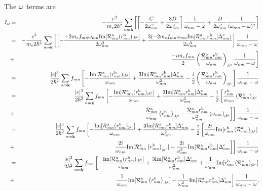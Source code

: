 The $\omega$ terms are
\begin{eqnarray}\label{pfia}
I_{\omega}
&=&
-\frac{e^3}{m_e2\hbar^2}
\sum_{nm\mathbf{k}}
\left[
\left[
-\frac{C}{2\omega^2_{nm}}
+
\frac{3D}{2\omega^3_{nm}}
\right]\frac{1}{\omega_{nm}-\omega}
+
\frac{D}{2\omega^2_{nm}}\frac{1}{(\omega_{nm}-\omega)^2}
\right]
\nonumber\\
&=&
-\frac{e^3}{m_e2\hbar^2}
\sum_{nm\mathbf{k}}
\left[
\left[
-\frac{-2m_ef_{mn}\omega_{mn}\mathrm{Im}[{\cal R}^{\mathrm{a}}_{mn}(r^{\mathrm{b}}_{nm})_{;k^{\mathrm{c}}}]
}{2\omega^2_{nm}}
+
\frac{3(-2m_ef_{mn}\omega_{mn}\mathrm{Im}[{\cal R}^{\mathrm{a}}_{mn}r^{\mathrm{b}}_{nm}]\Delta^{\mathrm{c}}_{nm})}{2\omega^3_{nm}}
\right]\frac{1}{\omega_{nm}-\omega}
\right.
\nonumber\\
&+&
\left.
\frac{-im_ef_{mn}}{2}
\left(
\frac{{\cal R}^{\mathrm{a}}_{mn}r^{\mathrm{b}}_{nm}}{\omega_{nm}}
\right)_{;k^{\mathrm{c}}}
\frac{1}{\omega_{nm}-\omega}
\right]
\nonumber\\
&=&
\frac{|e|^3}{2\hbar^2}
\sum_{nm\mathbf{k}}
f_{mn}
\left[
-\frac{\mathrm{Im}[{\cal R}^{\mathrm{a}}_{mn}(r^{\mathrm{b}}_{nm})_{;k^{\mathrm{c}}}]
}{\omega_{nm}}
+
\frac{3\mathrm{Im}[{\cal R}^{\mathrm{a}}_{mn}r^{\mathrm{b}}_{nm}]\Delta^{\mathrm{c}}_{nm}}{\omega^2_{nm}}
-
\frac{i}{2}
\left(
\frac{{\cal R}^{\mathrm{a}}_{mn}r^{\mathrm{b}}_{nm}}{\omega_{nm}}
\right)_{;k^{\mathrm{c}}}
\right]\frac{1}{\omega_{nm}-\omega}
\nonumber\\
&=&
\frac{|e|^3}{2\hbar^2}
\sum_{nm\mathbf{k}}
f_{mn}
\left[
-\frac{\mathrm{Im}[{\cal R}^{\mathrm{a}}_{mn}(r^{\mathrm{b}}_{nm})_{;k^{\mathrm{c}}}]
}{\omega_{nm}}
+
\frac{3\mathrm{Im}[{\cal R}^{\mathrm{a}}_{mn}r^{\mathrm{b}}_{nm}]\Delta^{\mathrm{c}}_{nm}}{\omega^2_{nm}}
-
\frac{i}{2}
\left[
\frac{r^{\mathrm{b}}_{nm}}{\omega_{nm}}
\left(
{\cal R}^{\mathrm{a}}_{mn}
\right)_{;k^{\mathrm{c}}}
\right.
\right.
\nonumber\\
&+&
\left.
\left.
\frac{{\cal R}^{\mathrm{a}}_{mn}}{\omega_{nm}}
\left(
r^{\mathrm{b}}_{nm}
\right)_{;k^{\mathrm{c}}}
-
\frac{{\cal R}^{\mathrm{a}}_{mn}r^{\mathrm{b}}_{nm}}{\omega^2_{nm}}
\left(
\omega_{nm}
\right)_{;k^{\mathrm{c}}}
\right]
\right]
\frac{1}{\omega_{nm}-\omega}
\nonumber\\
&=&
\frac{|e|^3}{2\hbar^2}
\sum_{nm\mathbf{k}}
f_{mn}
\left[
-\frac{\mathrm{Im}[{\cal R}^{\mathrm{a}}_{mn}(r^{\mathrm{b}}_{nm})_{;k^{\mathrm{c}}}]
}{\omega_{nm}}
+
\frac{3\mathrm{Im}[{\cal R}^{\mathrm{a}}_{mn}r^{\mathrm{b}}_{nm}]\Delta^{\mathrm{c}}_{nm}}{\omega^2_{nm}}
-
\frac{i}{2}
\left[
\frac{2i}{\omega_{nm}}
\mathrm{Im}[r^{\mathrm{b}}_{nm}\left({\cal R}^{\mathrm{a}}_{mn}\right)_{;k^{\mathrm{c}}}]
\right.
\right.
\nonumber\\
&+&
\left.
\left.
\frac{2i}{\omega_{nm}}
\mathrm{Im}[
{\cal R}^{\mathrm{a}}_{mn}
\left(
r^{\mathrm{b}}_{nm}
\right)_{;k^{\mathrm{c}}}
]
-
\frac{2i}{\omega^2_{nm}}
\mathrm{Im}[{\cal R}^{\mathrm{a}}_{mn}r^{\mathrm{b}}_{nm}]
\Delta^{\mathrm{c}}_{nm}
\right]
\right]
\frac{1}{\omega_{nm}-\omega}
\nonumber\\
&=&
\frac{|e|^3}{2\hbar^2}
\sum_{nm\mathbf{k}}
f_{mn}
\left[
-\frac{\mathrm{Im}[{\cal R}^{\mathrm{a}}_{mn}(r^{\mathrm{b}}_{nm})_{;k^{\mathrm{c}}}]
}{\omega_{nm}}
+
\frac{3\mathrm{Im}[{\cal R}^{\mathrm{a}}_{mn}r^{\mathrm{b}}_{nm}]\Delta^{\mathrm{c}}_{nm}}{\omega^2_{nm}}
+
\frac{1}{\omega_{nm}}
\mathrm{Im}[r^{\mathrm{b}}_{nm}\left({\cal R}^{\mathrm{a}}_{mn}\right)_{;k^{\mathrm{c}}}]
\right.
\nonumber\\
&+&
\left.
\frac{1}{\omega_{nm}}
\mathrm{Im}[
{\cal R}^{\mathrm{a}}_{mn}
\left(
r^{\mathrm{b}}_{nm}
\right)_{;k^{\mathrm{c}}}
]
-
\frac{1}{\omega^2_{nm}}
\mathrm{Im}[{\cal R}^{\mathrm{a}}_{mn}r^{\mathrm{b}}_{nm}]
\Delta^{\mathrm{c}}_{nm}
\right]
\frac{1}{\omega_{nm}-\omega}
,
\end{eqnarray}
